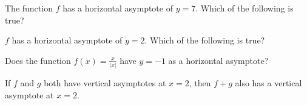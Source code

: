 \documentclass{ximera}
\begin{document}
\begin{problem}
  The function $f$ has a horizontal asymptote of $y = 7$.  Which of
  the following is true?
  \begin{multipleChoice}
     
  \end{multipleChoice}
\end{problem}

\begin{problem}
  $f$ has a horizontal asymptote of $y = 2$.  Which of the following is true?
  \begin{multipleChoice}
  \end{multipleChoice}
\end{problem}

\begin{problem}
  Does the function $f(x) = \frac{x}{|x|}$ have $y=-1$ as a horizontal asymptote?
  \begin{multipleChoice}
  \end{multipleChoice}
\end{problem}

\begin{problem}
  If $f$ and $g$ both have vertical asymptotes at $x=2$, then
  $f+g$ also has a vertical asymptote at $x=2$.
  \begin{multipleChoice}
  \end{multipleChoice}
\end{problem}



\end{document}
